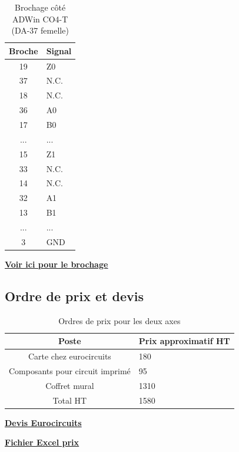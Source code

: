 \documentclass[a4paper,11pt]{beamer}
\begin{document}
\begin{frame}
\begin{table}[htbp]
  \centering
  \caption{Brochage côté ADWin CO4-T (DA-37 femelle)}
  \label{tab:brochage-x2}
  \footnotesize
  \begin{tabular}{cl}
    \toprule
    \textbf{Broche} & \textbf{Signal} \\
    \midrule
    19          & Z0 \\
    37          & N.C. \\
    18          & N.C. \\
    36          & A0 \\
    17          & B0 \\
    ...			&...\\
    15          & Z1 \\
    33          & N.C. \\
    14          & N.C. \\
    32          & A1 \\
    13          & B1 \\
    ...			&...\\
    3   & GND \\
    \bottomrule
  \end{tabular}
\end{table}
\centering
\textcolor{blue}{\textbf{\underline{\href{https://raw.githubusercontent.com/fbuloup/Interface_IAI/main/Documentation/ProI-HW_eng.pdf\#page=121}{Voir ici pour le brochage}}}}
\end{frame}

\subsection{Ordre de prix et devis}
\begin{frame}
\begin{table}[htbp]
  \centering
  \caption{Ordres de prix pour les deux axes}
  \label{tab:brochage-x2}
  \footnotesize
  \begin{tabular}{cl}
    \toprule
    \textbf{Poste} & \textbf{Prix approximatif HT} \\
    \midrule
    Carte chez eurocircuits          & 180 \\
    Composants pour circuit imprimé  & 95 \\
    Coffret mural          & 1310 \\
    \midrule
    Total HT          & 1580 \\
    \bottomrule
  \end{tabular}
\end{table}
\vspace{1cm}

\centering \textcolor{blue}{\textbf{\underline{\href{https://raw.githubusercontent.com/fbuloup/Interface_IAI/main/Documentation/DevisEurocircuits.pdf}{Devis Eurocircuits}}}}	

\textcolor{blue}{\textbf{\underline{\href{https://raw.githubusercontent.com/fbuloup/Interface_IAI/main/Interface_IAI.xlsx}{Fichier Excel prix}}}}	
\end{frame}
\end{document}
